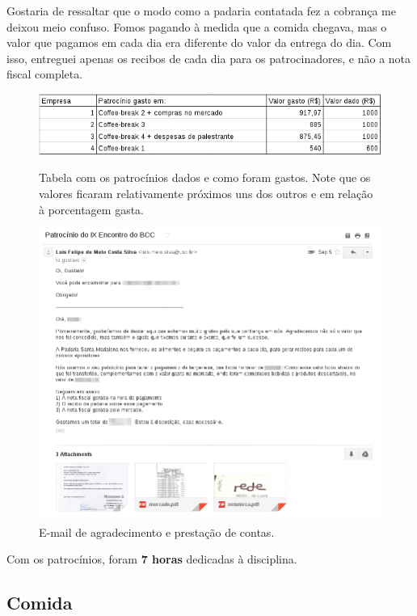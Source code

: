 \documentclass[12pt,letterpaper]{article}
\begin{document}
	Gostaria de ressaltar que o modo como a padaria contatada fez a cobrança me deixou meio confuso. Fomos pagando à medida que a comida chegava, mas o valor que pagamos em cada dia era diferente do valor da entrega do dia. Com isso, entreguei apenas os recibos de cada dia para os patrocinadores, e não a nota fiscal completa.
	
	\begin{figure}
		\begin{center}
			\includegraphics[scale=0.43]{tabela.png} 
			\caption{Tabela com os patrocínios dados e como foram gastos. Note que os valores ficaram relativamente próximos uns dos outros e em relação à porcentagem gasta.} 
			\includegraphics[scale=0.43]{conta.png} 
			\caption{E-mail de agradecimento e prestação de contas.}
		\end{center}
	\end{figure}
	
	Com os patrocínios, foram \textbf{7 horas} dedicadas à disciplina.
	
	
	\subsection{Comida}
	
\end{document}
